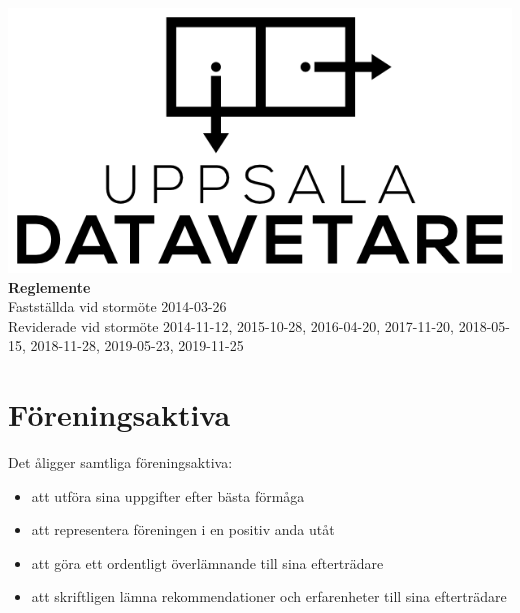 \documentclass[a4paper]{article}
\begin{document}
\begin{titlepage}
  \vspace*{\fill}
  \centering
  \vfill
  \vfill
  \includegraphics[width=\textwidth]{UD_center.png}
  {\huge\textbf{Reglemente}\\
    \vspace{0.3em}
    \large{Fastställda vid stormöte 2014-03-26\\
      Reviderade vid stormöte 2014-11-12, 2015-10-28, 2016-04-20, 2017-11-20,
      2018-05-15, 2018-11-28, 2019-05-23, 2019-11-25}}
  \vfill
  \vfill
  \vspace*{\fill}
\end{titlepage}
\renewcommand{\contentsname}{Innehåll\hfill\small Sida}
\tableofcontents
\cleardoublepage 
\setcounter{page}{1}
\cfoot{\thepage}
\section{Föreningsaktiva}
{Det åligger samtliga föreningsaktiva:
  \begin{itemize}
    \item att utföra sina uppgifter efter bästa förmåga
    \item att representera föreningen i en positiv anda utåt
    \item att göra ett ordentligt överlämnande till sina efterträdare
    \item att skriftligen lämna rekommendationer och erfarenheter till sina efterträdare
  \end{itemize}}
\end{document}
